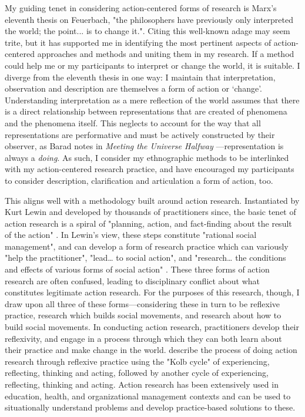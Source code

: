 My guiding tenet in considering action-centered forms of research is Marx's \citeyearpar[p. 173]{marx_selected_2000} eleventh thesis on Feuerbach, "the philosophers have previously only interpreted the world; the point... is to change it.". Citing this well-known adage may seem trite, but it has supported me in identifying the most pertinent aspects of action-centered approaches and methods and uniting them in my research. If a method could help me or my participants to interpret or change the world, it is suitable. I diverge from the eleventh thesis in one way: I maintain that interpretation, observation and description are themselves a form of action or `change'. Understanding interpretation as a mere reflection of the world assumes that there is a direct relationship between representations that are created of phenomena and the phenomena itself. This neglects to account for the way that all representations are performative and must be actively constructed by their observer, as Barad notes in \textit{Meeting the Universe Halfway} \citep{barad_meeting_2007}—representation is always a \textit{doing}. As such, I consider my ethnographic methods to be interlinked with my action-centered research practice, and have encouraged my participants to consider description, clarification and articulation a form of action, too.

This aligns well with a methodology built around action research. Instantiated by Kurt Lewin and developed by thousands of practitioners since, the basic tenet of action research is a spiral of "planning, action, and fact-finding about the result of the action" \citeyearpar[p. 38]{lewin_action_1946}. In Lewin’s view, these steps constitute "rational social management", and can develop a form of research practice which can variously "help the practitioner", "lead… to social action", and "research… the conditions and effects of various forms of social action" \citeyearpar[pp. 34–35]{lewin_action_1946}. These three forms of action research are often confused, leading to disciplinary conflict about what constitutes legitimate action research. For the purposes of this research, though, I draw upon all three of these forms—considering these in turn to be reflexive practice, research which builds social movements, and research about how to build social movements. In conducting action research, practitioners develop their reflexivity, and engage in a process through which they can both learn about their practice and make change in the world. \citet{burns_applying_2017} describe the process of doing action research through reflexive practice using the "Kolb cycle" of experiencing, reflecting, thinking and acting, followed by another cycle of experiencing, reflecting, thinking and acting. Action research has been extensively used in education, health, and organizational management contexts and can be used to situationally understand problems and develop practice-based solutions to these.

